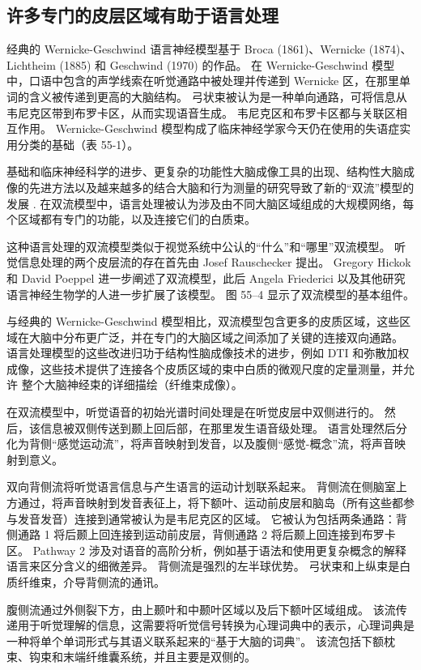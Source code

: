 \subsection{许多专门的皮层区域有助于语言处理}
经典的 Wernicke-Geschwind 语言神经模型基于 Broca (1861)、Wernicke (1874)、Lichtheim (1885) 和 Geschwind (1970) 的作品。 在 Wernicke-Geschwind 模型中，口语中包含的声学线索在听觉通路中被处理并传递到 Wernicke 区，在那里单词的含义被传递到更高的大脑结构。 弓状束被认为是一种单向通路，可将信息从韦尼克区带到布罗卡区，从而实现语音生成。 韦尼克区和布罗卡区都与关联区相互作用。 Wernicke-Geschwind 模型构成了临床神经学家今天仍在使用的失语症实用分类的基础（表 55-1）。

基础和临床神经科学的进步、更复杂的功能性大脑成像工具的出现、结构性大脑成像的先进方法以及越来越多的结合大脑和行为测量的研究导致了新的“双流”模型的发展 . 在双流模型中，语言处理被认为涉及由不同大脑区域组成的大规模网络，每个区域都有专门的功能，以及连接它们的白质束。

这种语言处理的双流模型类似于视觉系统中公认的“什么”和“哪里”双流模型。 听觉信息处理的两个皮层流的存在首先由 Josef Rauschecker 提出。 Gregory Hickok 和 David Poeppel 进一步阐述了双流模型，此后 Angela Friederici 以及其他研究语言神经生物学的人进一步扩展了该模型。 图 55–4 显示了双流模型的基本组件。

与经典的 Wernicke-Geschwind 模型相比，双流模型包含更多的皮质区域，这些区域在大脑中分布更广泛，并在专门的大脑区域之间添加了关键的连接双向通路。 语言处理模型的这些改进归功于结构性脑成像技术的进步，例如 DTI 和弥散加权成像，这些技术提供了连接各个皮质区域的束中白质的微观尺度的定量测量，并允许 整个大脑神经束的详细描绘（纤维束成像）。

在双流模型中，听觉语音的初始光谱时间处理是在听觉皮层中双侧进行的。 然后，该信息被双侧传送到颞上回后部，在那里发生语音级处理。 语言处理然后分化为背侧“感觉运动流”，将声音映射到发音，以及腹侧“感觉-概念”流，将声音映射到意义。

双向背侧流将听觉语言信息与产生语言的运动计划联系起来。 背侧流在侧脑室上方通过，将声音映射到发音表征上，将下额叶、运动前皮层和脑岛（所有这些都参与发音发音）连接到通常被认为是韦尼克区的区域。 它被认为包括两条通路：背侧通路 1 将后颞上回连接到运动前皮层，背侧通路 2 将后颞上回连接到布罗卡区。 Pathway 2 涉及对语音的高阶分析，例如基于语法和使用更复杂概念的解释语言来区分含义的细微差异。 背侧流是强烈的左半球优势。 弓状束和上纵束是白质纤维束，介导背侧流的通讯。

腹侧流通过外侧裂下方，由上颞叶和中颞叶区域以及后下额叶区域组成。 该流传递用于听觉理解的信息，这需要将听觉信号转换为心理词典中的表示，心理词典是一种将单个单词形式与其语义联系起来的“基于大脑的词典”。 该流包括下额枕束、钩束和末端纤维囊系统，并且主要是双侧的。

